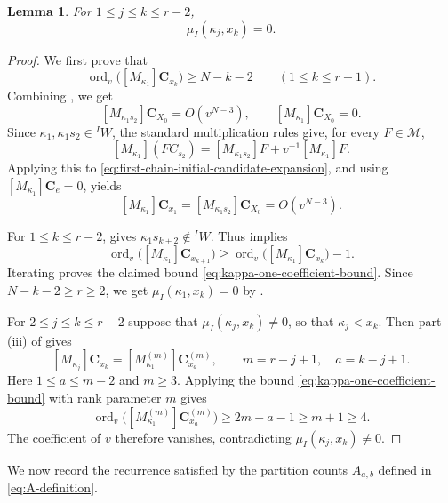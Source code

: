 \documentclass[11pt,a4paper,reqno]{amsart}
\numberwithin{equation}{section}
\newtheorem{lemma}[theorem]{Lemma}
\theoremstyle{definition}
\theoremstyle{remark}
\theoremstyle{plain}
\newcommand{\C}{\mathbf C}
\newcommand{\M}{\mathcal M}
\newcommand{\ord}{\operatorname{ord}_v}
\newcommand{\mus}{\mu_I}
\begin{document}
\begin{lemma}\label{lem:kappa-vanishing}
For $1\leq j\leq k\leq r-2$,
\begin{equation}\label{eq:kappa-vanishing}
 \mus(\kappa_j,x_k)=0.
\end{equation}
\end{lemma}
\begin{proof}
We first prove that
\begin{equation}\label{eq:kappa-one-coefficient-bound}
\ord\bigl([M_{\kappa_1}]\C_{x_k}\bigr)
\geq N-k-2
\qquad(1\leq k\leq r-1).
\end{equation}
Combining , we get
\[
[M_{\kappa_1s_2}]\C_{X_0}=O(v^{N-3}),
\qquad
[M_{\kappa_1}]\C_{X_0}=0.
\]
Since $\kappa_1,\kappa_1s_2\in {}^IW$, the standard multiplication rules give, for every $F\in\M$,
\[
[M_{\kappa_1}](F C_{s_2})
=[M_{\kappa_1s_2}]F+v^{-1}[M_{\kappa_1}]F.
\]
Applying this to
\eqref{eq:first-chain-initial-candidate-expansion},
and using $[M_{\kappa_1}]\C_e=0$, yields
\[
[M_{\kappa_1}]\C_{x_1}
=[M_{\kappa_1s_2}]\C_{X_0}
=O(v^{N-3}).
\]

For $1\leq k\leq r-2$,  gives $\kappa_1s_{k+2}\notin{}^I W$.
Thus  implies
\[
\ord\bigl([M_{\kappa_1}]\C_{x_{k+1}}\bigr)
\geq
\ord\bigl([M_{\kappa_1}]\C_{x_k}\bigr)-1.
\]
Iterating proves the claimed bound \eqref{eq:kappa-one-coefficient-bound}.
Since $N-k-2\geq r\geq2$, we get $\mus(\kappa_1,x_k)=0$ by .

For $2\leq j\leq k\leq r-2$ suppose that $\mus(\kappa_j,x_k)\neq0$, so that $\kappa_j<x_k$.
Then part (iii) of  gives
\[
[M_{\kappa_j}]\C_{x_k}
=
[M_{\kappa_1}^{(m)}]\C_{x_a}^{(m)},
\qquad
m=r-j+1,\quad a=k-j+1.
\]
Here $1\leq a\leq m-2$ and $m\geq3$.
Applying the bound \eqref{eq:kappa-one-coefficient-bound} with rank parameter $m$ gives
\[
\ord
\bigl([M_{\kappa_1}^{(m)}]\C_{x_a}^{(m)}\bigr)
\geq 2m-a-1\geq m+1\geq4.
\]
The coefficient of $v$ therefore vanishes, contradicting
$\mus(\kappa_j,x_k)\neq0$.
\end{proof}

We now record the recurrence satisfied by the partition counts $A_{a,b}$ defined in \eqref{eq:A-definition}.
\end{document}

